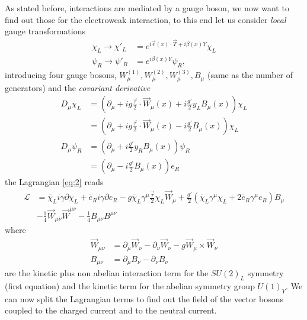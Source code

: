 As stated before, interactions are mediated by a gauge boson, we now want to
find out those for the electroweak interaction, to this end let us consider
\emph{local} gauge transformations
\begin{equation}
  \label{eq:11}
  \begin{split}
    \chi_{L} \rightarrow \chi'_{L} &= e^{i \vec\epsilon(x) \cdot \vec T
      + i \beta(x) Y} \chi_{L} \\
    \psi_{R} \to \psi'_{R} &= e^{i \beta(x) Y} \psi_{R},
  \end{split}
\end{equation}
introducing four gauge bosons,
$W_{\mu}^{(1)}, W_{\mu}^{(2)}, W_{\mu}^{(3)}, B_{\mu}$ (same as the number of
generators) and the \emph{covariant derivative}
\begin{equation}
  \label{eq:12}
  \begin{split}
    D_{\mu} \chi_{L} &= (\partial_{\mu} + i g \frac{\vec \tau}{2} \cdot
    \overrightarrow{W}_{\mu}(x) + i \frac{g'}{2} y_{L} B_{\mu}(x)) \chi_{L}
    \\
    &= (\partial_{\mu} + i g \frac{\vec \tau}{2}
    \cdot \overrightarrow{W}_{\mu}(x) - i \frac{g'}{2} B_{\mu}(x)) \chi_{L} \\
    D_{\mu} \psi_{R} &= (\partial_{\mu} + i \frac{g'}{2} y_{R} B_{\mu}(x))
    \psi_{R} \\
    &= (\partial_{\mu} - i \frac{g'}{2} B_{\mu}(x)) e_{R}
  \end{split}
\end{equation}
the Lagrangian \eqref{eq:2} reads
\begin{equation}
  \label{eq:13}
  \begin{split}
    \mathcal{L} &= \bar{\chi}_{L} i \gamma \partial \chi_{L} + \bar{e}_{R} i
    \gamma \partial e_{R} - g \bar{\chi}_{L} \gamma^{\mu} \frac{\vec{\tau}}{2}
    \chi_{L} \overrightarrow{W}_{\mu} + \frac{g'}{2} (\bar{\chi}_{L}
    \gamma^{\mu} \chi_{L} + 2 \bar{e}_{R} \gamma^{\mu} e_{R}) B_{\mu} \\
    &- \frac{1}{4} \overrightarrow{W}_{\mu\nu} \overrightarrow{W}^{\mu\nu} -
    \frac{1}{4} B_{\mu\nu}B^{\mu\nu}
  \end{split}
\end{equation}
where
\begin{equation}
  \label{eq:14}
  \begin{split}
    \overrightarrow{W}_{\mu\nu} &= \partial_{\mu} \overrightarrow{W}_{\nu}
    - \partial_{\nu} \overrightarrow{W}_{\nu}
    - g \overrightarrow{W}_{\mu} \times \overrightarrow{W}_{\nu} \\
    B_{\mu\nu} &= \partial_{\mu} B_{\nu} - \partial_{\nu} B_{\nu}
  \end{split}
\end{equation}
are the kinetic plus non abelian interaction term for the $SU(2)_{L}$ symmetry
(first equation) and the kinetic term for the abelian symmetry group
$U(1)_{Y}$. We can now split the Lagrangian terms to find out the field of the
vector bosons coupled to the charged current and to the neutral current.
